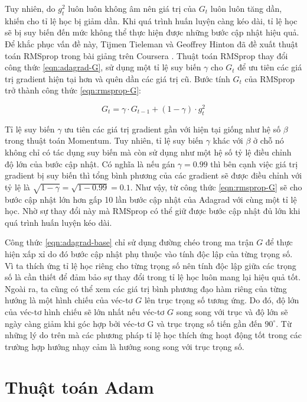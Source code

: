 Tuy nhiên, do $g^{2}_{t}$ luôn luôn không âm nên giá trị của $G_t$ luôn luôn tăng dần, khiến cho tỉ lệ học bị giảm dần. Khi quá trình huấn luyện càng kéo dài, tỉ lệ học sẽ bị suy biến đến mức không thể thực hiện được những bước cập nhật hiệu quả. Để khắc phục vấn đề này, Tijmen Tieleman và Geoffrey Hinton đã đề xuất thuật toán RMSprop trong bài giảng trên Coursera \cite{tieleman2012rmsprop}. Thuật toán RMSprop thay đổi công thức \ref{eqn:adagrad-G}, sử dụng một tỉ lệ suy biến $\gamma$ cho $G_t$ để ưu tiên các giá trị gradient hiện tại hơn và quên dần các giá trị cũ. Bước tính $G_t$ của RMSprop trở thành công thức \ref{eqn:rmsprop-G}:

\begin{equation}
	\label{eqn:rmsprop-G}
	G_{t} = \gamma \cdot G_{t-1} + (1-\gamma) \cdot g^{2}_t
\end{equation}

Tỉ lệ suy biến $\gamma$ ưu tiên các giá trị gradient gần với hiện tại giống như hệ số $\beta$ trong thuật toán Momentum. Tuy nhiên, tỉ lệ suy biến $\gamma$ khác với $\beta$ ở chỗ nó không chỉ có tác dụng suy biến mà còn sử dụng như một hệ số tỷ lệ điều chỉnh độ lớn của bước cập nhật. Có nghĩa là nếu gán $\gamma = 0.99$ thì bên cạnh việc giá trị gradient bị suy biến thì tổng bình phương của các gradient sẽ được điều chỉnh với tỷ lệ là $\sqrt{1-\gamma} = \sqrt{1 - 0.99} = 0.1$. Như vậy, từ công thức \ref{eqn:rmsprop-G} sẽ cho bước cập nhật lớn hơn gấp 10 lần bước cập nhật của Adagrad với cùng một tỉ lệ học. Nhờ sự thay đổi này mà RMSprop có thể giữ được bước cập nhật đủ lớn khi quá trình huấn luyện kéo dài.

Công thức \ref{eqn:adagrad-base} chỉ sử dụng đường chéo trong ma trận $G$ để thực hiện xấp xỉ do đó bước cập nhật phụ thuộc vào tính độc lập của từng trọng số. Vì ta thích ứng tỉ lệ học riêng cho từng trọng số nên tính độc lập giữa các trọng số là cần thiết để đảm bảo sự thay đổi trong tỉ lệ học luôn mang lại hiệu quả tốt. Ngoài ra, ta cũng có thể xem các giá trị bình phương đạo hàm riêng của từng hướng là một hình chiếu của véc-tơ $G$ lên trục trọng số tương ứng. Do đó, độ lớn của véc-tơ hình chiếu sẽ lớn nhất nếu véc-tơ $G$ song song với trục và độ lớn sẽ ngày càng giảm khi góc hợp bởi véc-tơ G và trục trọng số tiến gần đến $90^\circ$. Từ những lý do trên mà các phương pháp tỉ lệ học thích ứng hoạt động tốt trong các trường hợp hướng nhạy cảm là hướng song song với trục trọng số.

\section{Thuật toán Adam}

